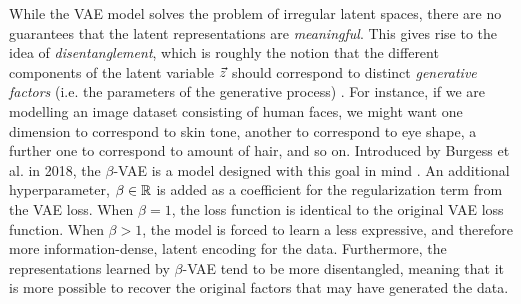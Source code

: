 While the VAE model solves the problem of irregular latent spaces, there are no guarantees that the latent representations are {\it meaningful}. This gives rise to the idea of {\it disentanglement}, which is roughly the notion that the different components of the latent variable $\vec{z}$ should correspond to distinct {\it generative factors} (i.e. the parameters of the generative process) \cite{bengio2012representation}. For instance, if we are modelling an image dataset consisting of human faces, we might want one dimension to correspond to skin tone, another to correspond to eye shape, a further one to correspond to amount of hair, and so on. Introduced by Burgess et al. in 2018, the $\beta$-VAE is a model designed with this goal in mind \cite{higgins2016beta}. An additional hyperparameter, $\beta \in \mathbb{R}$ is added as a coefficient for the regularization term from the VAE loss. When $\beta=1$, the loss function is identical to the original VAE loss function. When $\beta > 1$, the model is forced to learn a less expressive, and therefore more information-dense, latent encoding for the data. Furthermore, the representations learned by $\beta$-VAE tend to be more disentangled, meaning that it is more possible to recover the original factors that may have generated the data.